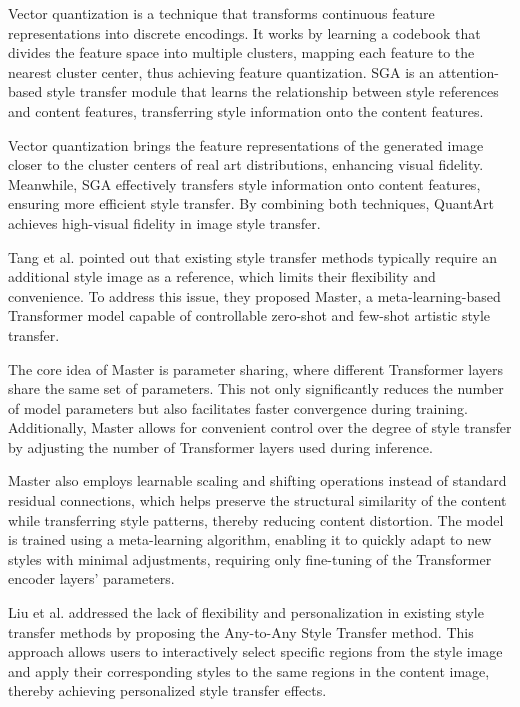 \documentclass[preprint,12pt]{elsarticle}
\begin{document}
Vector quantization is a technique that transforms continuous feature representations into discrete encodings. It works by learning a codebook that divides the feature space into multiple clusters, mapping each feature to the nearest cluster center, thus achieving feature quantization. SGA is an attention-based style transfer module that learns the relationship between style references and content features, transferring style information onto the content features. 

Vector quantization brings the feature representations of the generated image closer to the cluster centers of real art distributions, enhancing visual fidelity. Meanwhile, SGA effectively transfers style information onto content features, ensuring more efficient style transfer. By combining both techniques, QuantArt achieves high-visual fidelity in image style transfer.

Tang et al.\citep{114tang2023master} pointed out that existing style transfer methods typically require an additional style image as a reference, which limits their flexibility and convenience. To address this issue, they proposed Master, a meta-learning-based Transformer model capable of controllable zero-shot and few-shot artistic style transfer. 

The core idea of Master is parameter sharing, where different Transformer layers share the same set of parameters. This not only significantly reduces the number of model parameters but also facilitates faster convergence during training. Additionally, Master allows for convenient control over the degree of style transfer by adjusting the number of Transformer layers used during inference. 

Master also employs learnable scaling and shifting operations instead of standard residual connections, which helps preserve the structural similarity of the content while transferring style patterns, thereby reducing content distortion. The model is trained using a meta-learning algorithm, enabling it to quickly adapt to new styles with minimal adjustments, requiring only fine-tuning of the Transformer encoder layers’ parameters.

Liu et al.\citep{116liu2304any} addressed the lack of flexibility and personalization in existing style transfer methods by proposing the Any-to-Any Style Transfer method. This approach allows users to interactively select specific regions from the style image and apply their corresponding styles to the same regions in the content image, thereby achieving personalized style transfer effects.
\end{document}
